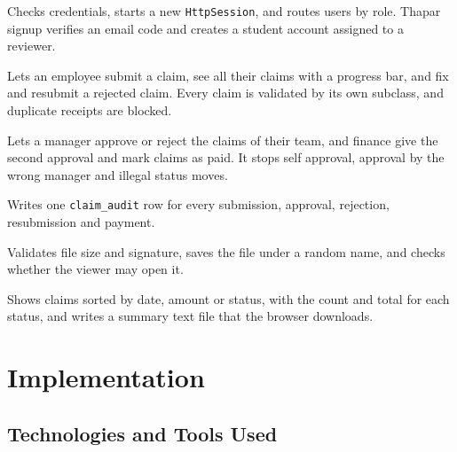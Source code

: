\documentclass[12pt,a4paper]{report}
\begin{document}
\begin{description}[style=nextline,leftmargin=0.6cm]
  \item[Login and signup module] Checks credentials, starts a new \texttt{HttpSession}, and routes users by role. Thapar signup verifies an email code and creates a student account assigned to a reviewer.
  \item[Claim module] Lets an employee submit a claim, see all their claims with a progress bar, and fix and resubmit a rejected claim. Every claim is validated by its own subclass, and duplicate receipts are blocked.
  \item[Approval module] Lets a manager approve or reject the claims of their team, and finance give the second approval and mark claims as paid. It stops self approval, approval by the wrong manager and illegal status moves.
  \item[Audit module] Writes one \texttt{claim\_audit} row for every submission, approval, rejection, resubmission and payment.
  \item[Proof module] Validates file size and signature, saves the file under a random name, and checks whether the viewer may open it.
  \item[Report module] Shows claims sorted by date, amount or status, with the count and total for each status, and writes a summary text file that the browser downloads.
\end{description}

\chapter{Implementation}

\section{Technologies and Tools Used}
\end{document}
